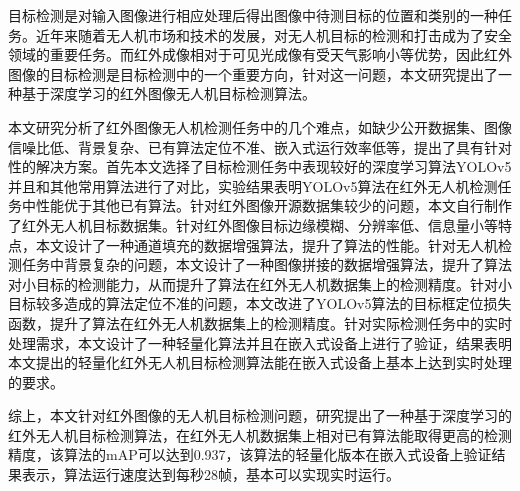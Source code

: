 \begin{cabstract}
  目标检测是对输入图像进行相应处理后得出图像中待测目标的位置和类别的一种任务。近年来随着无人机市场和技术的发展，对无人机目标的检测和打击成为了安全领域的重要任务。而红外成像相对于可见光成像有受天气影响小等优势，因此红外图像的目标检测是目标检测中的一个重要方向，针对这一问题，本文研究提出了一种基于深度学习的红外图像无人机目标检测算法。

本文研究分析了红外图像无人机检测任务中的几个难点，如缺少公开数据集、图像信噪比低、背景复杂、已有算法定位不准、嵌入式运行效率低等，提出了具有针对性的解决方案。首先本文选择了目标检测任务中表现较好的深度学习算法YOLOv5并且和其他常用算法进行了对比，实验结果表明YOLOv5算法在红外无人机检测任务中性能优于其他已有算法。针对红外图像开源数据集较少的问题，本文自行制作了红外无人机目标数据集。针对红外图像目标边缘模糊、分辨率低、信息量小等特点，本文设计了一种通道填充的数据增强算法，提升了算法的性能。针对无人机检测任务中背景复杂的问题，本文设计了一种图像拼接的数据增强算法，提升了算法对小目标的检测能力，从而提升了算法在红外无人机数据集上的检测精度。针对小目标较多造成的算法定位不准的问题，本文改进了YOLOv5算法的目标框定位损失函数，提升了算法在红外无人机数据集上的检测精度。针对实际检测任务中的实时处理需求，本文设计了一种轻量化算法并且在嵌入式设备上进行了验证，结果表明本文提出的轻量化红外无人机目标检测算法能在嵌入式设备上基本上达到实时处理的要求。

综上，本文针对红外图像的无人机目标检测问题，研究提出了一种基于深度学习的红外无人机目标检测算法，在红外无人机数据集上相对已有算法能取得更高的检测精度，该算法的mAP可以达到0.937，该算法的轻量化版本在嵌入式设备上验证结果表示，算法运行速度达到每秒28帧，基本可以实现实时运行。
\end{cabstract}

